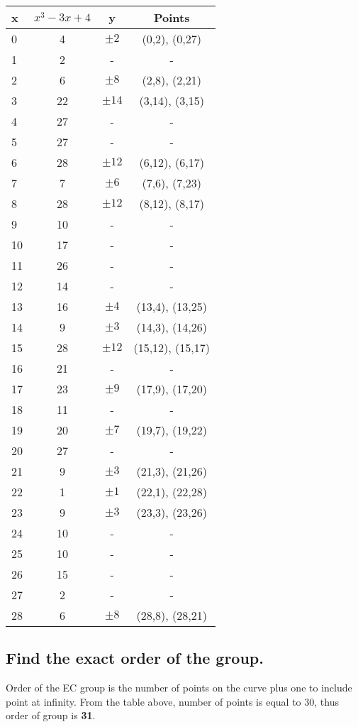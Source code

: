 \documentclass[11pt, pdftex]{article}
\begin{document}
\begin{center}
\begin{tabular}{|l|c|c|c|}
 \hline
x & $x^{3} - 3x + 4$ & y & Points \\
\hline
0 & 4 & $\pm2$ & (0,2), (0,27) \\
\hline
1 & 2 & - &  - \\
\hline
2 & 6 & $\pm8$ & (2,8), (2,21) \\
\hline
3 & 22 & $\pm14$ & (3,14), (3,15) \\
\hline
4 & 27 & - &  - \\
\hline
5 & 27 & - &  - \\
\hline
6 & 28 & $\pm12$ & (6,12), (6,17) \\
\hline
7 & 7 & $\pm6$ & (7,6), (7,23) \\
\hline
8 & 28 & $\pm12$ & (8,12), (8,17) \\
\hline
9 & 10 & - &  - \\
\hline
10 & 17 & - &  - \\
\hline
11 & 26 & - &  - \\
\hline
12 & 14 & - &  - \\
\hline
13 & 16 & $\pm4$ & (13,4), (13,25) \\
\hline
14 & 9 & $\pm3$ & (14,3), (14,26) \\
\hline
15 & 28 & $\pm12$ & (15,12), (15,17) \\
\hline
16 & 21 & - &  - \\
\hline
17 & 23 & $\pm9$ & (17,9), (17,20) \\
\hline
18 & 11 & - &  - \\
\hline
19 & 20 & $\pm7$ & (19,7), (19,22) \\
\hline
20 & 27 & - &  - \\
\hline
21 & 9 & $\pm3$ & (21,3), (21,26) \\
\hline
22 & 1 & $\pm1$ & (22,1), (22,28) \\
\hline
23 & 9 & $\pm3$ & (23,3), (23,26) \\
\hline
24 & 10 & - &  - \\
\hline
25 & 10 & - &  - \\
\hline
26 & 15 & - &  - \\
\hline
27 & 2 & - &  - \\
\hline
28 & 6 & $\pm8$ & (28,8), (28,21) \\
\hline
\end{tabular}
\end{center}
\subsection{Find the exact order of the group.}
Order of the EC group is the number of points on the curve plus one to include point at infinity. From the table above, number of points is equal to 30, thus order of group is {\bf 31}.
\end{document}
